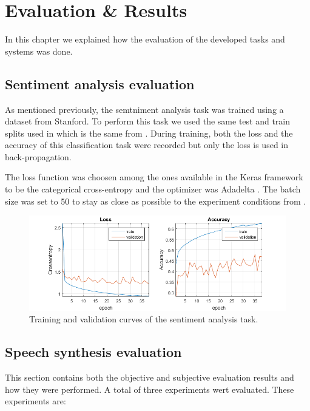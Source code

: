 \chapter{Evaluation \& Results}

In this chapter we explained how the evaluation of the developed tasks and systems was done.

\section{Sentiment analysis evaluation}

As mentioned previously, the semtniment analysis task was trained using a dataset from Stanford. To perform this task we used the same test and train splits used in \cite{socher2013recursive} which is the same from \cite{DBLP:journals/corr/Kim14f}. During training, both the loss and the accuracy of this classification task were recorded but only the loss is used in back-propagation.

The loss function was choosen among the ones available in the Keras framework to be the categorical cross-entropy \cite{golik2013cross} and the optimizer was Adadelta \cite{zeiler2012adadelta}. The batch size was set to 50 to stay as close as possible to the experiment conditions from \cite{DBLP:journals/corr/Kim14f}.

\begin{figure}[h]
    \centering
    \includegraphics[width=16cm]{figures/sa}
    \caption{Training and validation curves of the sentiment analysis task.}
\end{figure}

\section{Speech synthesis evaluation}

This section contains both the objective and subjective evaluation results and how they were performed. A total of three experiments wert evaluated. These experiments are:

